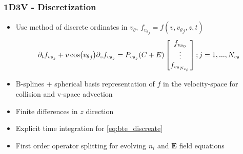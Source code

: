 \documentclass[mathserif, aspectratio=169]{beamer}
\newcommand{\vect}[1]{\boldsymbol{#1}}
\newcommand{\of}[1]{\mleft( #1 \mright)}
\newcommand{\vtheta}{{v_{\theta}}}
\begin{document}
\begin{frame}
	\frametitle{1D3V - Discretization}
	\begin{itemize}
		\item Use method of discrete ordinates in $\vtheta$, $f_{\vtheta_j} = f(v, \vtheta_j, z, t)$
		\begin{align}
			\partial_t f_{\vtheta_j} + v\cos\of{\vtheta_j} \partial_z f_{\vtheta_j} = P_{\vtheta_j} (C + E) \begin{bmatrix}
				f_{\vtheta_0}\\
				\vdots\\
				f_{\vtheta_{N_\vtheta}}\\
			\end{bmatrix} ; j=1,..., N_{\vtheta}
			\label{eq:bte_discreate}
		\end{align}
		\item B-splines + spherical basis representation of $f$ in the velocity-space for collision and v-space advection
		\item Finite differences in $z$ direction
		\item Explicit time integration for \eqref{eq:bte_discreate}
		\item First order operator splitting for evolving $n_i$ and $\vect{E}$ field equations
	\end{itemize}
\end{frame}
\end{document}
